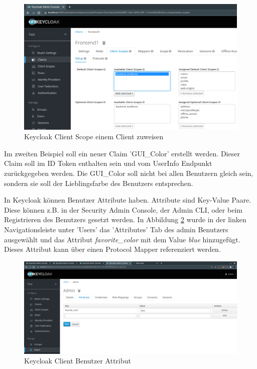 \begin{figure}[!ht]
	\centering
	\includegraphics[width=1\textwidth]{Images/Ebert/KeycloakAddAudClientScope.PNG}
	\caption{Keycloak Client Scope einem Client zuweisen}
	\label{fig:EB_Keycloak Client Scope einem Client zuweisen}
\end{figure}

Im zweiten Beispiel soll ein neuer Claim 'GUI\_Color' erstellt werden. Dieser Claim soll im ID Token enthalten sein und vom UserInfo Endpunkt zurückgegeben werden. Die GUI\_Color soll nicht bei allen Benutzern gleich sein, sondern sie soll der Lieblingsfarbe des Benutzers entsprechen.

In Keycloak können Benutzer Attribute haben. Attribute sind Key-Value Paare. Diese können z.B. in der Security Admin Console, der Admin CLI, oder beim Registrieren des Benutzers gesetzt werden. In Abbildung \ref{fig:EB_Keycloak Client User Attribut} wurde in der linken Navigationsleiste unter 'Users' das 'Attributes' Tab des admin Benutzers ausgewählt und das Attribut \textit{favorite\_color} mit dem Value \textit{blue} hinzugefügt. Dieses Attribut kann über einen Protocol Mapper referenziert werden.

\begin{figure}[!ht]
	\centering
	\includegraphics[width=1\textwidth]{Images/Ebert/KeycloakNewUserAttribute.PNG}
	\caption{Keycloak Client Benutzer Attribut}
	\label{fig:EB_Keycloak Client User Attribut}
\end{figure}

